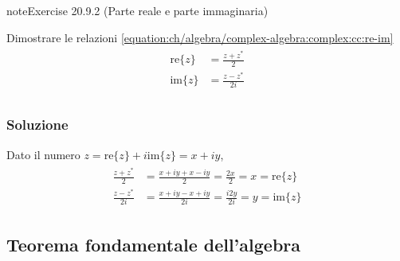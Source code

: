 \documentclass[letterpaper,10pt,italian]{jupyterBook}
\begin{document}
\begin{sphinxadmonition}{note}{Exercise 20.9.2 (Parte reale e parte immaginaria)}



\sphinxAtStartPar
Dimostrare le relazioni \eqref{equation:ch/algebra/complex-algebra:complex:cc:re-im}
\begin{equation*}
\begin{split}\begin{aligned}
  \text{re}\{z\} & = \frac{z + z^*}{2} \\
  \text{im}\{z\} & = \frac{z - z^*}{2i} \\
\end{aligned}\end{split}
\end{equation*}\subsubsection*{Soluzione}

\sphinxAtStartPar
Dato il numero \(z = \text{re}\{z\} + i \text{im}\{z\} = x + i y\),
\begin{equation*}
\begin{split}\begin{aligned}
 \frac{z + z^*}{2}  & = \frac{x+iy+x-iy}{2}  = \frac{2x}{2} = x = \text{re}\{z\} \\
 \frac{z - z^*}{2i} & = \frac{x+iy-x+iy}{2i} = \frac{i2y}{2i} = y = \text{im}\{z\}
\end{aligned}\end{split}
\end{equation*}\end{sphinxadmonition}


\subsection{Teorema fondamentale dell’algebra}
\label{\detokenize{ch/algebra/complex-algebra-problems:teorema-fondamentale-dell-algebra}}\label{\detokenize{ch/algebra/complex-algebra-problems:math-hs-algebra-complex-problems-fund-thm}} \label{exercise:ch/algebra/complex-algebra-problems-exercise-2}
\end{document}
